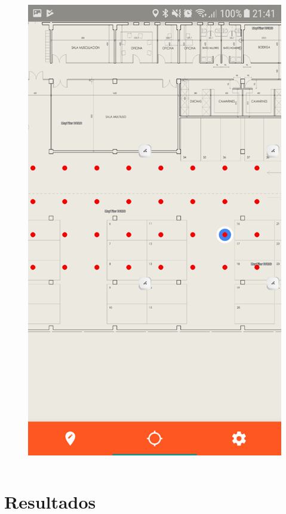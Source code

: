 \documentclass[mathserif]{beamer}
\begin{document}
\begin{frame}
\begin{columns}[t]
\begin{figure}
\includegraphics[width=\textwidth]{../figures/fase_online3.png}
\end{figure}

\end{columns}

\end{frame}

\section{Resultados}
\end{document}
